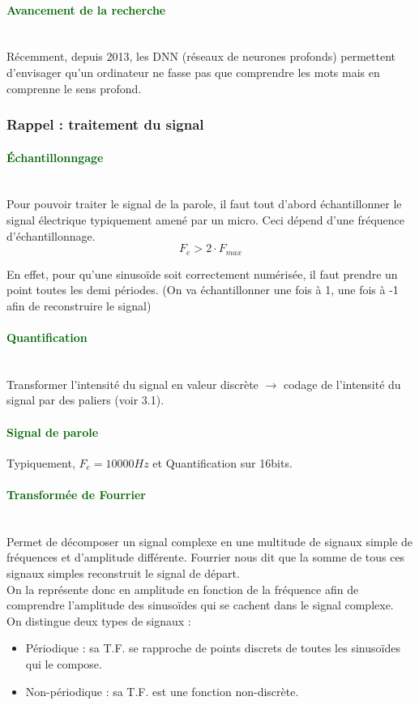 \documentclass[letterpaper, 12pt]{article}
\newcommand{\alinea}{
\hspace*{0.3cm}}
\newcommand{\green}[1]{
	\textcolor{darkgreen}{#1}
}
\begin{document}
		\paragraph{\green{Avancement de la recherche}}~\\
			Récemment, depuis 2013, les DNN (réseaux de neurones profonds) permettent d'envisager qu'un 
				ordinateur ne fasse pas que comprendre les mots mais en comprenne le sens profond.
		\subsubsection{Rappel : traitement du signal}
			\paragraph{\green{\'Echantillonngage}}~\\
				\alinea Pour pouvoir traiter le signal de la parole, il faut tout d'abord échantillonner
				le signal électrique typiquement amené par un micro. Ceci dépend d'une fréquence d'échantillonnage.
				$$ F_e > 2\cdot F_{max} $$
				\alinea En effet, pour qu'une sinusoïde soit correctement numérisée, il faut prendre un
				point toutes les demi périodes. (On va échantillonner une fois à 1, une fois à -1 afin de 
				reconstruire le signal)
			\paragraph{\green{Quantification}}~\\
				\alinea Transformer l'intensité du signal en valeur discrète $\rightarrow$ codage de
				l'intensité du signal par des paliers (voir 3.1).
			\paragraph{\green{Signal de parole}} Typiquement, $F_e = 10000Hz$ et Quantification sur 16bits.
			\paragraph{\green{Transformée de Fourrier}}~\\
				\alinea Permet de décomposer un signal complexe en une multitude de signaux simple de fréquences
				et d'amplitude différente. Fourrier nous dit que la somme de tous ces signaux simples reconstruit
				le signal de départ.\\
				\alinea On la représente donc en amplitude en fonction de la fréquence afin de comprendre 
				l'amplitude des sinusoïdes qui se cachent dans le signal complexe.~\\
				\alinea On distingue deux types de signaux : 
				\begin{itemize}
					\setlength{\itemsep}{0pt}
					\setlength{\parskip}{0pt}
					\setlength{\parsep}{0pt}
					\item Périodique : sa T.F. se rapproche de points discrets de toutes les sinusoïdes qui le 
						compose.
					\item Non-périodique : sa T.F. est une fonction non-discrète.
				\end{itemize}
\end{document}

